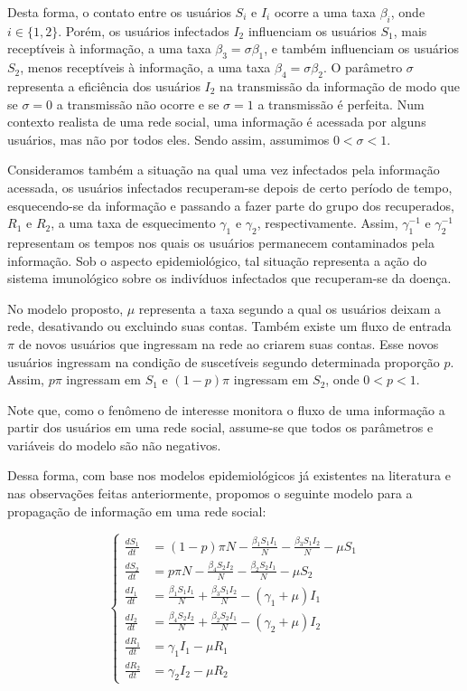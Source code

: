 \documentclass[
	12pt,				%
	openright,			%
	oneside,			%
	a4paper,			%
	english,			%
	french,				%
	spanish,			%
	brazil				%
	]{abntex2}
\begin{document}
Desta forma, o contato entre os usuários $S_i$ e $I_i$ ocorre a uma
taxa $\beta_i$, onde $i \in \{1,2\}$. Porém, os usuários infectados
$I_2$ influenciam os usuários $S_1$, mais receptíveis à informação, a
uma taxa $\beta_3 = \sigma \beta_1$, e também influenciam os usuários
$S_2$, menos receptíveis à informação, a uma taxa $\beta_4 = \sigma
\beta_2$. O parâmetro $\sigma$ representa a eficiência dos usuários
$I_2$ na transmissão da informação de modo que se $\sigma = 0$ a
transmissão não ocorre e se $\sigma = 1$ a transmissão é perfeita. Num
contexto realista de uma rede social, uma informação é acessada por
alguns usuários, mas não por todos eles. Sendo assim, assumimos $0 <
\sigma < 1$.

Consideramos também a situação na qual uma vez infectados pela
informação acessada, os usuários infectados recuperam-se depois de
certo período de tempo, esquecendo-se da informação e passando a fazer
parte do grupo dos recuperados, $R_1$ e $R_2$, a uma taxa de
esquecimento $\gamma_1$ e $\gamma_2$, respectivamente. Assim,
$\gamma_1^{-1}$ e $\gamma_2^{-1}$ representam os tempos nos quais os usuários
permanecem contaminados pela informação. Sob o aspecto epidemiológico,
tal situação representa a ação do sistema imunológico sobre os
indivíduos infectados que recuperam-se da doença.

No modelo proposto, $\mu$ representa a taxa segundo a qual os usuários
deixam a rede, desativando ou excluindo suas contas. Também existe um
fluxo de entrada $\pi$ de novos usuários que ingressam na rede ao
criarem suas contas. Esse novos usuários ingressam na condição de
suscetíveis segundo determinada proporção $p$. Assim, $p\pi$ ingressam
em $S_1$ e $(1-p)\pi$ ingressam em $S_2$, onde $0 < p < 1$.

Note que, como o fenômeno de interesse monitora o fluxo de uma
informação a partir dos usuários em uma rede social, assume-se que
todos os parâmetros e variáveis do modelo são não negativos.

Dessa forma, com base nos modelos epidemiológicos já existentes na
literatura e nas observações feitas anteriormente, propomos o seguinte
modelo para a propagação de informação em uma rede social:

\begin{equation*}
  \left\{ \begin{aligned}
  \frac{dS_1}{dt} &= (1-p)\pi N - \frac{\beta_1 S_1 I_1}{N} - \frac{\beta_3 S_1 I_2}{N} - \mu S_1 \nonumber \\
  \frac{dS_2}{dt} &= p\pi N - \frac{\beta_4 S_2 I_2}{N} - \frac{\beta_2 S_2 I_1}{N} - \mu S_2 \nonumber \\
  \frac{dI_1}{dt} &= \frac{\beta_1 S_1 I_1}{N} + \frac{\beta_3 S_1 I_2}{N} - (\gamma_1 + \mu)I_1 \nonumber \\
  \frac{dI_2}{dt} &= \frac{\beta_4 S_2 I_2}{N} + \frac{\beta_2 S_2 I_1}{N} - (\gamma_2 + \mu)I_2 \nonumber \\
  \frac{dR_1}{dt} &= \gamma_1 I_1 - \mu R_1 \nonumber \\
  \frac{dR_2}{dt} &= \gamma_2 I_2 - \mu R_2 \nonumber
  \end{aligned}
  \right.
\end{equation*}
\end{document}
